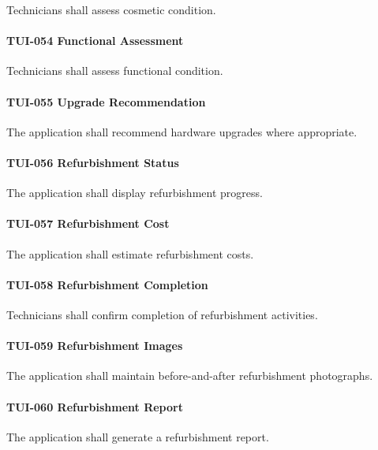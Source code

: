 Technicians shall assess cosmetic condition.

\paragraph{TUI-054 Functional Assessment}

Technicians shall assess functional condition.

\paragraph{TUI-055 Upgrade Recommendation}

The application shall recommend hardware upgrades where appropriate.

\paragraph{TUI-056 Refurbishment Status}

The application shall display refurbishment progress.

\paragraph{TUI-057 Refurbishment Cost}

The application shall estimate refurbishment costs.

\paragraph{TUI-058 Refurbishment Completion}

Technicians shall confirm completion of refurbishment activities.

\paragraph{TUI-059 Refurbishment Images}

The application shall maintain before-and-after refurbishment
photographs.

\paragraph{TUI-060 Refurbishment Report}

The application shall generate a refurbishment report.


